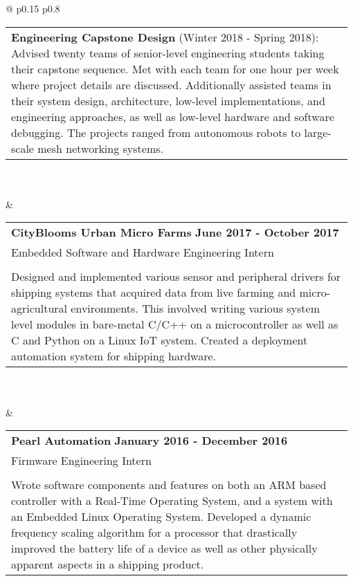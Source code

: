 \documentclass[letterpaper,11pt,oneside,a4paper]{article}
\def \tablefillwidth {0.98\linewidth}
\begin{document}
\begin{longtable}{@{\extracolsep{\fill}} p{0.15\textwidth} p{0.8\textwidth}}
\begin{tabular}[t]{@{\extracolsep{\fill}} p{\tablefillwidth}}
\textbf{Engineering Capstone Design} (Winter 2018 - Spring 2018):
Advised twenty teams of senior-level engineering students taking their capstone sequence. Met with each team for one hour per week where project details are discussed. Additionally assisted teams in their system design, architecture, low-level implementations, and engineering approaches, as well as low-level hardware and software debugging. The projects ranged from autonomous robots to large-scale mesh networking systems.\\

\end{tabular} \\

\\ &
\begin{tabular}[t]{@{\extracolsep{\fill}} p{\tablefillwidth}}
{\large{\textbf{CityBlooms Urban Micro Farms}}} \hspace*{\fill} \textbf{June 2017 - October 2017}
\\
Embedded Software and Hardware Engineering Intern \\\\

Designed and implemented various sensor and peripheral drivers for shipping systems that acquired data from live farming and micro-agricultural environments. This involved writing various system level modules in bare-metal C/C++ on a microcontroller as well as C and Python on a Linux IoT system. Created a deployment automation system for shipping hardware.
\end{tabular} \\

\\ &
\begin{tabular}[t]{@{\extracolsep{\fill}} p{\tablefillwidth}}
{\large{\textbf{Pearl Automation}}} \hspace*{\fill} \textbf{January 2016 - December 2016}
\\
Firmware Engineering Intern \\\\

Wrote software components and features on both an ARM based controller with a Real-Time Operating System, and a system with an Embedded Linux Operating System.
Developed a dynamic frequency scaling algorithm for a processor that drastically improved the battery life of a device as well as other physically apparent aspects in a shipping product.
\end{tabular}


\end{longtable}
\end{document}
